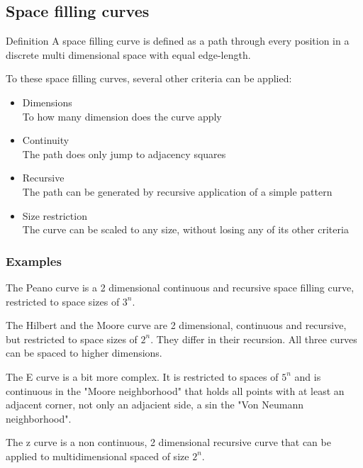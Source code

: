 \subsection{Space filling curves}
\label{sec:curves}
\par{Definition}
A space filling curve is defined as a path through every position in a discrete multi dimensional space with equal edge-length.%

To these space filling curves, several other criteria can be applied:
\begin{itemize}%
   \item Dimensions\\
      To how many dimension does the curve apply
   \item Continuity\\
      The path does only jump to adjacency squares
   \item Recursive\\
      The path can be generated by recursive application of a simple pattern
   \item Size restriction\\
      The curve can be scaled to any size, without losing any of its other criteria
\end{itemize}%

\subsubsection{Examples}
\label{subsec:curve_examples}

The Peano curve is a 2 dimensional continuous and recursive space filling curve, restricted to space sizes of $3^{n}$.

The Hilbert and the Moore curve are 2 dimensional, continuous and recursive, but restricted to space sizes of $2^{n}$. They differ in their recursion. All three curves can be spaced to higher dimensions.
 
The E curve is a bit more complex. It is restricted to spaces of $5^{n}$ and is continuous in the "Moore neighborhood" that holds all points with at least an adjacent corner, not only an adjacient side, a sin the "Von Neumann neighborhood".

The z curve is a non continuous, 2 dimensional recursive curve that can be applied to multidimensional spaced of size $2^{n}$.

